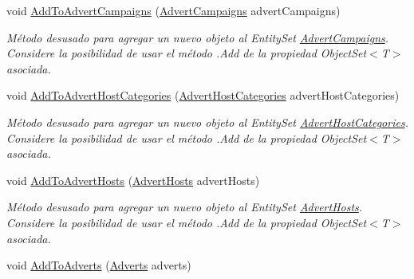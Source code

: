 \begin{DoxyCompactItemize}
void \hyperlink{class_microsoft_1_1_samples_1_1_kinect_1_1_basic_interactions_1_1_o_m_k_t_d_b_entities_a165b2ce51c904ce23573a248f4063acc}{Add\-To\-Advert\-Campaigns} (\hyperlink{class_microsoft_1_1_samples_1_1_kinect_1_1_basic_interactions_1_1_advert_campaigns}{Advert\-Campaigns} advert\-Campaigns)
\begin{DoxyCompactList}\small\item\em Método desusado para agregar un nuevo objeto al Entity\-Set \hyperlink{class_microsoft_1_1_samples_1_1_kinect_1_1_basic_interactions_1_1_advert_campaigns}{Advert\-Campaigns}. Considere la posibilidad de usar el método .Add de la propiedad Object\-Set$<$T$>$ asociada. \end{DoxyCompactList}\item 
void \hyperlink{class_microsoft_1_1_samples_1_1_kinect_1_1_basic_interactions_1_1_o_m_k_t_d_b_entities_a82d57fc8a0da7eb504c97bea654b0133}{Add\-To\-Advert\-Host\-Categories} (\hyperlink{class_microsoft_1_1_samples_1_1_kinect_1_1_basic_interactions_1_1_advert_host_categories}{Advert\-Host\-Categories} advert\-Host\-Categories)
\begin{DoxyCompactList}\small\item\em Método desusado para agregar un nuevo objeto al Entity\-Set \hyperlink{class_microsoft_1_1_samples_1_1_kinect_1_1_basic_interactions_1_1_advert_host_categories}{Advert\-Host\-Categories}. Considere la posibilidad de usar el método .Add de la propiedad Object\-Set$<$T$>$ asociada. \end{DoxyCompactList}\item 
void \hyperlink{class_microsoft_1_1_samples_1_1_kinect_1_1_basic_interactions_1_1_o_m_k_t_d_b_entities_a37cb7157b7adcd540107beecbde57997}{Add\-To\-Advert\-Hosts} (\hyperlink{class_microsoft_1_1_samples_1_1_kinect_1_1_basic_interactions_1_1_advert_hosts}{Advert\-Hosts} advert\-Hosts)
\begin{DoxyCompactList}\small\item\em Método desusado para agregar un nuevo objeto al Entity\-Set \hyperlink{class_microsoft_1_1_samples_1_1_kinect_1_1_basic_interactions_1_1_advert_hosts}{Advert\-Hosts}. Considere la posibilidad de usar el método .Add de la propiedad Object\-Set$<$T$>$ asociada. \end{DoxyCompactList}\item 
void \hyperlink{class_microsoft_1_1_samples_1_1_kinect_1_1_basic_interactions_1_1_o_m_k_t_d_b_entities_a45dfbc89c53d8d044ae3ff81de57e681}{Add\-To\-Adverts} (\hyperlink{class_microsoft_1_1_samples_1_1_kinect_1_1_basic_interactions_1_1_adverts}{Adverts} adverts)

\end{DoxyCompactItemize}
